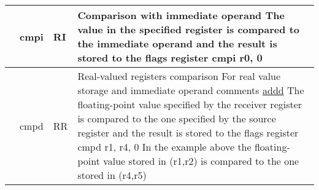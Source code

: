 \documentclass{article}
\newcommand{\St}[1]{{\fontfamily{qcr}\selectfont #1}}
\newcommand{\Ss}[1]{{\fontfamily{cmss}\selectfont #1}}
\begin{document}
{\begin{table*}[h!]
\begin{tabular}{| >{\centering\arraybackslash} m{1cm} | >{\centering\arraybackslash} m{1.4cm} | >{\centering\arraybackslash} m{1.2cm} | m{11.6cm} |}
 \hline
 
 44 & \St{cmpi} & \Ss{RI} &
 
 Comparison with immediate operand \newline
 The value in the specified register is compared to the immediate operand \newline
 and the result is stored to the \St{flags} register \newline
 \St{cmpi r0, 0} \\
 
 \hline
 
 45 & \St{cmpd} & \Ss{RR} &
 
 Real-valued registers comparison \newline
 For real value storage and immediate operand comments \hyperlink{addd}{\St{addd}} \newline
 The floating-point value specified by the receiver register is compared to \newline
 the one specified by the source register and the result is stored \newline
 to the \St{flags} register \newline
 \St{cmpd r1, r4, 0} \newline
 In the example above the floating-point value stored in \St{(r1,r2)} is \newline
 compared to the one stored in \St{(r4,r5)} \\
 
 \hline

\end{tabular}
\end{table*}
}

\newpage
\end{document}
